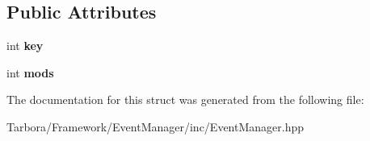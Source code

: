 \subsection*{Public Attributes}
\begin{DoxyCompactItemize}
\item 
\mbox{\label{structTarbora_1_1KeyReleaseEvent_ad157189bb14682e1ba053622fbee8c54}} 
int {\bfseries key}
\item 
\mbox{\label{structTarbora_1_1KeyReleaseEvent_a08d426d5507c6676ffbaf1f5bf9bfb92}} 
int {\bfseries mods}
\end{DoxyCompactItemize}


The documentation for this struct was generated from the following file\+:\begin{DoxyCompactItemize}
\item 
Tarbora/\+Framework/\+Event\+Manager/inc/Event\+Manager.\+hpp\end{DoxyCompactItemize}

